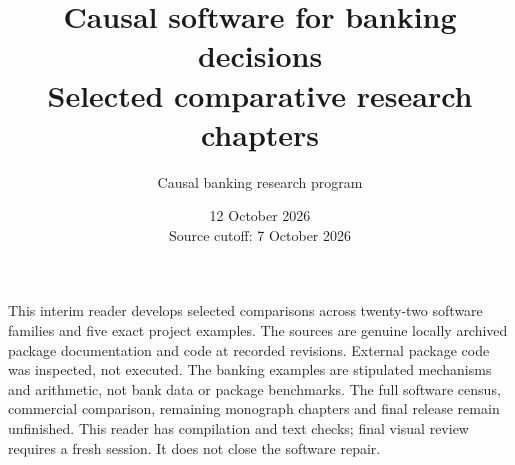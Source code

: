 \documentclass[11pt,openany]{book}
\title{Causal software for banking decisions\\\large Selected comparative research chapters}
\author{Causal banking research program}
\date{12 October 2026\\Source cutoff: 7 October 2026}
\begin{document}
\pagestyle{plain}
\raggedbottom
\maketitle
\thispagestyle{empty}
\noindent This interim reader develops selected comparisons across twenty-two
software families and five exact project examples. The sources are genuine
locally archived package documentation and code at recorded revisions. External
package code was inspected, not executed. The banking examples are stipulated
mechanisms and arithmetic, not bank data or package benchmarks. The full
software census, commercial comparison, remaining monograph chapters and final
release remain unfinished. This reader has compilation and text checks; final
visual review requires a fresh session. It does not close the software repair.
\tableofcontents

\label{sw:body-end}\clearpage

\end{document}
